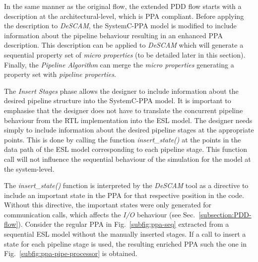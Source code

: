 In the same manner as the original flow, the extended PDD flow starts with a description at the architectural-level, which is PPA compliant. Before applying the description to \textit{DeSCAM}, the SystemC-PPA model is modified to include information about the pipeline behaviour resulting in an enhanced PPA description. This description can be applied to \textit{DeSCAM} which will generate a sequential property set of \textit{micro properties} (to be detailed later in this section). Finally, the \textit{Pipeline Algorithm} can merge the \textit{micro properties} generating a property set with \textit{pipeline properties}.

The \textit{Insert Stages} phase allows the designer to include information about the desired pipeline structure into the SystemC-PPA model. It is important to emphasise that the designer does not have to translate the concurrent pipeline behaviour from the RTL implementation into the ESL model. The designer needs simply to include information about the desired pipeline stages at the appropriate points. This is done by calling the function \textit{insert\_state()} at the points in the data path of the ESL model corresponding to each pipeline stage. This function call will not influence the sequential behaviour of the simulation for the model at the system-level.

The \textit{insert\_state()} function is interpreted by the \textit{DeSCAM} tool as a directive to include an important state in the PPA for that respective position in the code. Without this directive, the important states were only generated for communication calls, which affects the \textit{I/O} behaviour (see Sec.~\ref{subsection:PDD-flow}). Consider the regular PPA in Fig.~\ref{subfig:ppa-seq} extracted from a sequential ESL model without the manually inserted stages. If a call to insert a state for each pipeline stage is used, the resulting enriched PPA such the one in Fig.~\ref{subfig:ppa-pipe-processor} is obtained.

